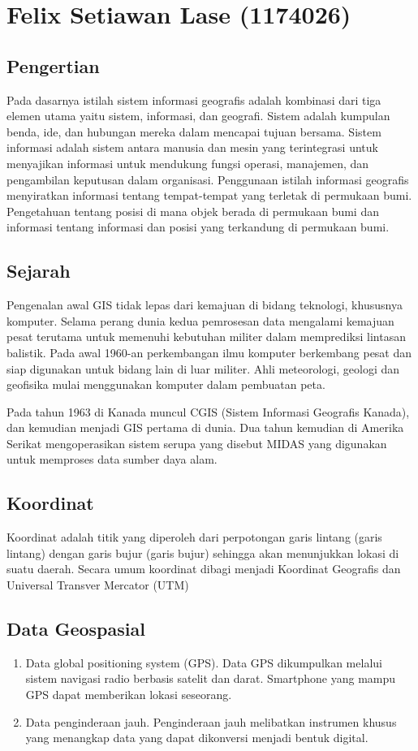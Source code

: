 \section{Felix Setiawan Lase (1174026)}
\subsection{Pengertian}
Pada dasarnya istilah sistem informasi geografis adalah kombinasi dari tiga elemen utama yaitu sistem, informasi, dan geografi.
Sistem adalah kumpulan benda, ide, dan hubungan mereka dalam mencapai tujuan bersama.\hfill\break
Sistem informasi adalah sistem antara manusia dan mesin yang terintegrasi untuk menyajikan informasi untuk mendukung fungsi operasi, manajemen, dan pengambilan keputusan dalam organisasi.\hfill\break
Penggunaan istilah informasi geografis menyiratkan informasi tentang tempat-tempat yang terletak di permukaan bumi. Pengetahuan tentang posisi di mana objek berada di permukaan bumi dan informasi tentang informasi dan posisi yang terkandung di permukaan bumi.
\subsection{Sejarah}
Pengenalan awal GIS tidak lepas dari kemajuan di bidang teknologi, khususnya komputer. Selama perang dunia kedua pemrosesan data mengalami kemajuan pesat terutama untuk memenuhi kebutuhan militer dalam memprediksi lintasan balistik. Pada awal 1960-an perkembangan ilmu komputer berkembang pesat dan siap digunakan untuk bidang lain di luar militer. Ahli meteorologi, geologi dan geofisika mulai menggunakan komputer dalam pembuatan peta.\hfill\break

Pada tahun 1963 di Kanada muncul CGIS (Sistem Informasi Geografis Kanada), dan kemudian menjadi GIS pertama di dunia. Dua tahun kemudian di Amerika Serikat mengoperasikan sistem serupa yang disebut MIDAS yang digunakan untuk memproses data sumber daya alam.
\subsection{Koordinat}
Koordinat adalah titik yang diperoleh dari perpotongan garis lintang (garis lintang) dengan garis bujur (garis bujur) sehingga akan menunjukkan lokasi di suatu daerah. Secara umum koordinat dibagi menjadi Koordinat Geografis dan Universal Transver Mercator (UTM)
\subsection{Data Geospasial}
\begin{enumerate}
	\item Data global positioning system (GPS). Data GPS dikumpulkan melalui sistem navigasi radio berbasis satelit dan darat. Smartphone yang mampu GPS dapat memberikan lokasi seseorang.
	\item Data penginderaan jauh. Penginderaan jauh melibatkan instrumen khusus yang menangkap data yang dapat dikonversi menjadi bentuk digital. 
\end{enumerate}\hfill\break

